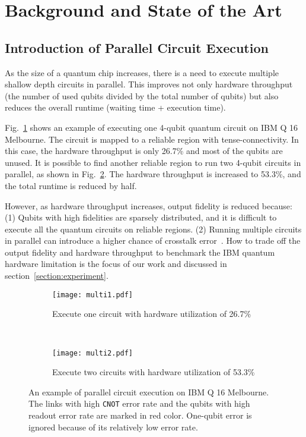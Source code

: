 \documentclass[conference]{IEEEtran}
\begin{document}
\section{Background and State of the Art}

\subsection{Introduction of Parallel Circuit Execution}
As the size of a quantum chip increases, there is a need to execute multiple shallow depth circuits in parallel. This improves not only hardware throughput (the number of used qubits divided by the total number of qubits) but also reduces the overall runtime (waiting time + execution time). 


Fig.~\ref{fig:multi_1} shows an example of executing one 4-qubit quantum circuit on IBM Q 16 Melbourne. The circuit is mapped to a reliable region with tense-connectivity. In this case, the hardware throughput is only 26.7\% and most of the qubits are unused. It is possible to find another reliable region to run two 4-qubit circuits in parallel, as shown in Fig.~\ref{fig:multi_2}. The hardware throughput is increased to 53.3\%, and the total runtime is reduced by half.

However, as hardware throughput increases, output fidelity is reduced because: (1) Qubits with high fidelities are sparsely distributed, and it is difficult to execute all the quantum circuits on reliable regions. (2) Running multiple circuits in parallel can introduce a higher chance of crosstalk error~\cite{sheldon2016procedure}. How to trade off the output fidelity and hardware throughput to benchmark the IBM quantum hardware limitation is the focus of our work and discussed in section~\ref{section:experiment}. 

\begin{figure}[h]
\begin{subfigure}{\linewidth}
\centering
\texttt{[image: multi1.pdf]}
\caption{Execute one circuit with hardware utilization of 26.7\%}
\label{fig:multi_1}
\end{subfigure}\\
\begin{subfigure}{\linewidth}
\centering
\texttt{[image: multi2.pdf]}
\caption{Execute two circuits with hardware utilization of 53.3\%}
\label{fig:multi_2}
\end{subfigure}
\caption{An example of parallel circuit execution on IBM Q 16 Melbourne. The links with high \texttt{CNOT} error rate and the qubits with high readout error rate are marked in red color. One-qubit error is ignored because of its relatively low error rate.}
\label{fig:multiprogramming}
\end{figure}
\end{document}
